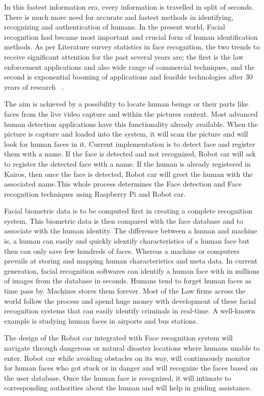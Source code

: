\documentclass[sigconf]{acmart}
\begin{document}
In this fastest information era, every information is travelled in split of seconds. There is much more need for accurate and fastest methods in identifying, recognizing and authentication of humans. In the present world, Facial recognition had became most important and crucial form of human identification methods. As per Literature survey statistics in face recognition, the two trends to receive significant attention for the past several years are; the first is the law enforcement applications and also wide range of commercial techniques, and the second is exponential booming of applications and feasible technologies after 30 years of research ~\cite{Riddhi2013}.

The aim is achieved by a possibility to locate human beings or their parts like faces from the live video capture and within the pictures context. Most advanced human detection applications have this functionality already available. When the picture is capture and loaded into the system, it will scan the picture and will look for human faces in it. Current implementation is to detect face and register them with a name. If the face is detected and not recognized, Robot car will ask to register the detected face with a name. If the human is already registered in Kairos, then once the face is detected, Robot car will greet the human with the associated name.This whole process determines the Face detection and Face recognition techniques using Raspberry Pi and Robot car.

Facial biometric data is to be computed first in creating a complete recognition system. This biometric data is then compared with the face database and to associate with the human identity. The difference between a human and machine is, a human can easily and quickly identify characteristics of a human face but then can only save few hundreds of faces. Whereas a machine or computers prevails at storing and mapping human characteristics and meta data. In current generation, facial recognition softwares can identify a human face with in millions of images from the database in seconds. Humans tend to forget human faces as time pass by. Machines stores them forever. Most of the Law firms across the world follow the process and spend huge money with development of these facial recognition systems that can easily identify criminals in real-time. A well-known example is studying human faces in airports and bus stations.

The design of the Robot car integrated with Face recognition system will navigate through dangerous or natural disaster locations where humans unable to enter. Robot car while avoiding obstacles on its way, will continuously monitor for human faces who got stuck or in danger and will recognize the faces based on the user database. Once the human face is recognized, it will intimate to corresponding authorities about the human and will help in guiding assistance. 
\end{document}
